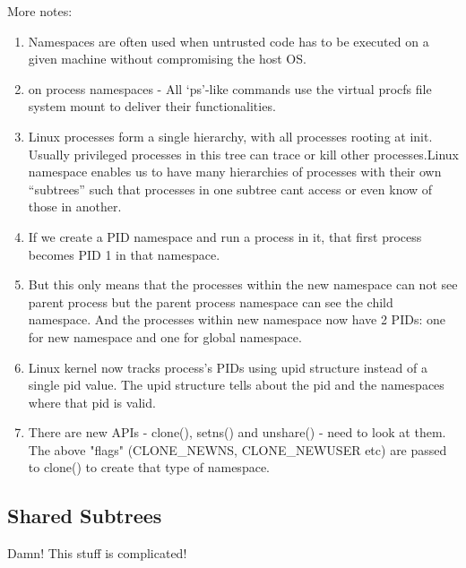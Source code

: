 More notes:

\begin{enumerate}
	\item Namespaces are often used when untrusted code has to be executed on a given machine without compromising 
		the host OS.
	\item on process namespaces - All ‘ps’-like commands use the virtual procfs file system mount to deliver their functionalities.
	\item Linux processes form a single hierarchy, with all processes rooting at init. Usually privileged processes in this tree can trace or kill other processes.Linux namespace enables us to have many hierarchies of processes with their own “subtrees” such that processes in one subtree cant access or even know of those in another.
	\item If we create a PID namespace and run a process in it, that first process becomes PID 1 in that namespace. 
	\item But this only means that the processes within the new namespace can not see parent process but the parent process namespace can see the child namespace. And the processes within new namespace now have 2 PIDs: one for new namespace and one for global namespace.
	\item Linux kernel now tracks process’s PIDs using upid structure instead of a single pid value. The upid structure tells about the pid and the namespaces where that pid is valid.
	\item There are new APIs - clone(), setns() and unshare() - need to look at them.
The above "flags" (CLONE\_NEWNS, CLONE\_NEWUSER etc) are passed to clone() to create that type of namespace.
\end{enumerate}


\subsection{Shared Subtrees}

Damn! This stuff is complicated!


